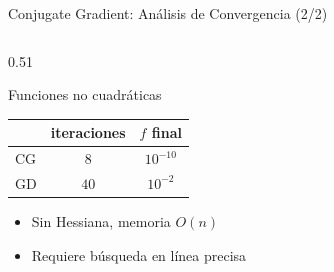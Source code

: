 \begin{frame}{Conjugate Gradient: Análisis de Convergencia (2/2)}
\begin{columns}[T]
\begin{column}{0.51\textwidth}
\begin{alertblock}{Funciones no cuadráticas}
            \end{alertblock}
            \centering
            \small
            \begin{tabular}{l c c}
                \toprule
                & iteraciones & $f$ final \\
                \midrule
                CG & $8$ & $10^{-10}$ \\
                GD & $40$ & $10^{-2}$ \\
                \bottomrule
            \end{tabular}

            \vspace{0.6em}
            \raggedright
            \begin{itemize}
                \item[$+$] Sin Hessiana, memoria $O(n)$
                \item[$-$] Requiere búsqueda en línea precisa
            \end{itemize}
        \end{column}
    \end{columns}
\end{frame}

